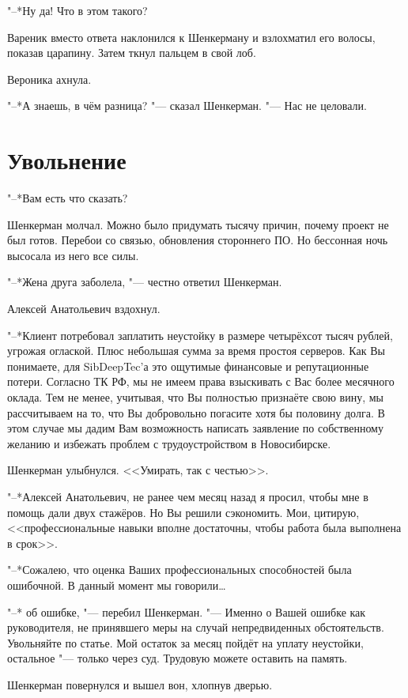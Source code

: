 "--*Ну да!
Что в этом такого?

Вареник вместо ответа наклонился к Шенкерману и взлохматил его волосы, показав царапину.
Затем ткнул пальцем в свой лоб.

Вероника ахнула.

"--*А знаешь, в чём разница? "--- сказал Шенкерман.
"--- Нас не целовали.

\section{Увольнение}

"--*Вам есть что сказать?

Шенкерман молчал.
Можно было придумать тысячу причин, почему проект не был готов.
Перебои со связью, обновления стороннего ПО.
Но бессонная ночь высосала из него все силы.

"--*Жена друга заболела, "--- честно ответил Шенкерман.

Алексей Анатольевич вздохнул.

"--*Клиент потребовал заплатить неустойку в размере четырёхсот тысяч рублей, угрожая оглаской.
Плюс небольшая сумма за время простоя серверов.
Как Вы понимаете, для SibDeepTec'а это ощутимые финансовые и репутационные потери.
Согласно ТК РФ, мы не имеем права взыскивать с Вас более месячного оклада.
Тем не менее, учитывая, что Вы полностью признаёте свою вину, мы рассчитываем на то, что Вы добровольно погасите хотя бы половину долга.
В этом случае мы дадим Вам возможность написать заявление по собственному желанию и избежать проблем с трудоустройством в Новосибирске.

Шенкерман улыбнулся.
<<Умирать, так с честью>>.

"--*Алексей Анатольевич, не ранее чем месяц назад я просил, чтобы мне в помощь дали двух стажёров.
Но Вы решили сэкономить.
Мои, цитирую, <<профессиональные навыки вполне достаточны, чтобы работа была выполнена в срок>>.

"--*Сожалею, что оценка Ваших профессиональных способностей была ошибочной.
В данный момент мы говорили\ldots

"--* \ldotst об ошибке, "--- перебил Шенкерман.
"--- Именно о Вашей ошибке как руководителя, не принявшего меры на случай непредвиденных обстоятельств.
Увольняйте по статье.
Мой остаток за месяц пойдёт на уплату неустойки, остальное "--- только через суд.
Трудовую можете оставить на память.

Шенкерман повернулся и вышел вон, хлопнув дверью.

